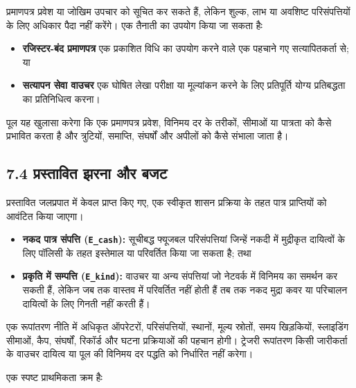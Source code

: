 \documentclass[11pt]{article}
\begin{document}
प्रमाणपत्र प्रवेश या जोखिम उपचार को सूचित कर सकते हैं, लेकिन शुल्क, लाभ या अवशिष्ट परिसंपत्तियों के लिए अधिकार पैदा नहीं करेंगे। एक तैनाती का उपयोग किया जा सकता हैः

\begin{itemize}[leftmargin=*]
\item \textbf{रजिस्टर-बंद प्रमाणपत्र} एक प्रकाशित विधि का उपयोग करने वाले एक पहचाने गए सत्यापितकर्ता से; या
\item \textbf{सत्यापन सेवा वाउचर} एक घोषित लेखा परीक्षा या मूल्यांकन करने के लिए प्रतिपूर्ति योग्य प्रतिबद्धता का प्रतिनिधित्व करना।
\end{itemize}
पूल यह खुलासा करेगा कि एक प्रमाणपत्र प्रवेश, विनिमय दर के तरीकों, सीमाओं या पात्रता को कैसे प्रभावित करता है और त्रुटियों, समाप्ति, संघर्षों और अपीलों को कैसे संभाला जाता है।

\subsection*{7.4 प्रस्तावित झरना और बजट}

प्रस्तावित जलप्रपात में केवल प्राप्त किए गए, एक स्वीकृत शासन प्रक्रिया के तहत पात्र प्राप्तियों को आवंटित किया जाएगा।

\begin{itemize}[leftmargin=*]
\item \textbf{नकद पात्र संपत्ति (\texttt{E\_cash}):} सूचीबद्ध फ्यूजबल परिसंपत्तियां जिन्हें नकदी में मुद्रीकृत दायित्वों के लिए पॉलिसी के तहत इस्तेमाल या परिवर्तित किया जा सकता है; तथा
\item \textbf{प्रकृति में सम्पत्ति (\texttt{E\_kind}):} वाउचर या अन्य संपत्तियां जो नेटवर्क में विनिमय का समर्थन कर सकती हैं, लेकिन जब तक वास्तव में परिवर्तित नहीं होती हैं तब तक नकद मुद्रा कवर या परिचालन दायित्वों के लिए गिनती नहीं करती हैं।
\end{itemize}
एक रूपांतरण नीति में अधिकृत ऑपरेटरों, परिसंपत्तियों, स्थानों, मूल्य स्रोतों, समय खिड़कियों, स्लाइडिंग सीमाओं, कैप, संघर्षों, रिकॉर्ड और घटना प्रक्रियाओं की पहचान होगी। ट्रेजरी रूपांतरण किसी जारीकर्ता के वाउचर दायित्व या पूल की विनिमय दर पद्धति को निर्धारित नहीं करेगा।

एक स्पष्ट प्राथमिकता क्रम हैः
\end{document}
